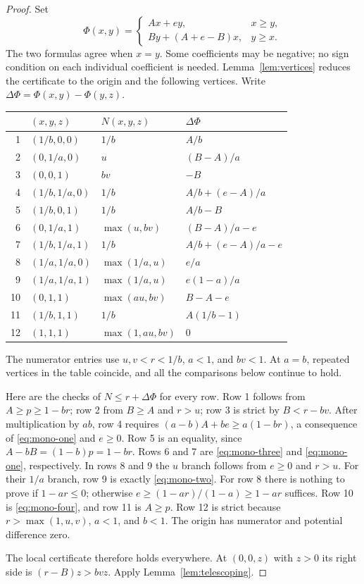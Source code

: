 \documentclass[11pt,a4paper]{article}
\theoremstyle{remark}
\begin{document}
\begin{proof}
Set
\begin{equation}\label{eq:monotone-potential}
 \Phi(x,y)=
 \begin{cases}
 Ax+ey,&x\ge y,\\
 By+(A+e-B)x,&y\ge x.
 \end{cases}
\end{equation}
The two formulas agree when $x=y$.
Some coefficients may be negative; no sign condition on each individual
coefficient is needed. Lemma~\ref{lem:vertices} reduces the certificate
to the origin and the following vertices. Write
$\Delta\Phi=\Phi(x,y)-\Phi(y,z)$.
\begin{center}
\renewcommand{\arraystretch}{1.35}
\begin{tabular}{@{}rlll@{}}
\toprule
 & $(x,y,z)$ & $N(x,y,z)$ & $\Delta\Phi$\\
\midrule
1 & $(1/b,0,0)$ & $1/b$ & $A/b$\\
2 & $(0,1/a,0)$ & $u$ & $(B-A)/a$\\
3 & $(0,0,1)$ & $bv$ & $-B$\\
4 & $(1/b,1/a,0)$ & $1/b$ & $A/b+(e-A)/a$\\
5 & $(1/b,0,1)$ & $1/b$ & $A/b-B$\\
6 & $(0,1/a,1)$ & $\max(u,bv)$ & $(B-A)/a-e$\\
7 & $(1/b,1/a,1)$ & $1/b$ & $A/b+(e-A)/a-e$\\
8 & $(1/a,1/a,0)$ & $\max(1/a,u)$ & $e/a$\\
9 & $(1/a,1/a,1)$ & $\max(1/a,u)$ & $e(1-a)/a$\\
10 & $(0,1,1)$ & $\max(au,bv)$ & $B-A-e$\\
11 & $(1/b,1,1)$ & $1/b$ & $A(1/b-1)$\\
12 & $(1,1,1)$ & $\max(1,au,bv)$ & $0$\\
\bottomrule
\end{tabular}
\end{center}
The numerator entries use $u,v<r<1/b$, $a<1$, and $bv<1$.
At $a=b$, repeated vertices in the table coincide, and all the
comparisons below continue to hold.

Here are the checks of $N\le r+\Delta\Phi$ for every row.
Row 1 follows from $A\ge p\ge1-br$; row 2 from $B\ge A$ and $r>u$;
row 3 is strict by $B<r-bv$.
After multiplication by $ab$, row 4 requires
$(a-b)A+be\ge a(1-br)$, a consequence of \eqref{eq:mono-one} and $e\ge0$.
Row 5 is an equality, since $A-bB=(1-b)p=1-br$.
Rows 6 and 7 are \eqref{eq:mono-three} and \eqref{eq:mono-one}, respectively.
In rows 8 and 9 the $u$ branch follows from $e\ge0$ and $r>u$.
For their $1/a$ branch, row 9 is exactly \eqref{eq:mono-two}.
For row 8 there is nothing to prove if $1-ar\le0$; otherwise
$e\ge(1-ar)/(1-a)\ge1-ar$ suffices.
Row 10 is \eqref{eq:mono-four}, and row 11 is $A\ge p$.
Row 12 is strict because $r>\max(1,u,v)$, $a<1$, and $b<1$.
The origin has numerator and potential difference zero.

The local certificate therefore holds everywhere.
At $(0,0,z)$ with $z>0$ its right side is $(r-B)z>bvz$.
Apply Lemma~\ref{lem:telescoping}.
\end{proof}
\end{document}
